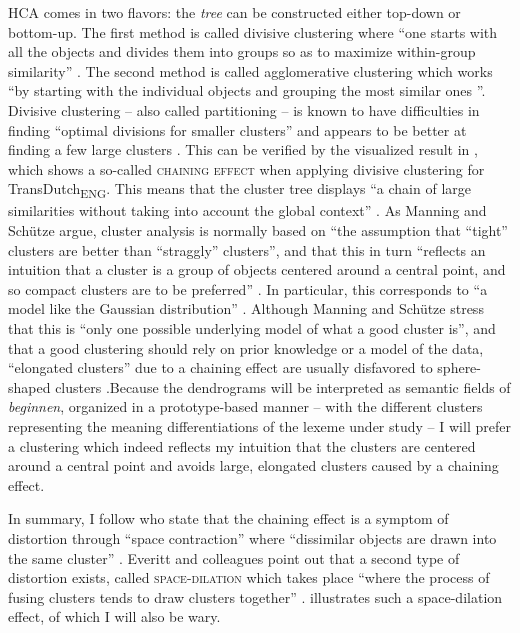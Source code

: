 HCA comes in two flavors: the \textit{tree} can be constructed either top-down or bottom-up. The first method is called divisive clustering where “one starts with all the objects and divides them into groups so as to maximize within-group similarity” \citep[501]{manning_foundations_1999}. The second method is called agglomerative clustering which works “by starting with the individual objects and grouping the most similar ones \citep[500--501]{manning_foundations_1999}”. Divisive clustering – also called partitioning – is known to have difficulties in finding “optimal divisions for smaller clusters” and appears to be better at finding a few large clusters \citep[138]{baayen_analyzing_2008}. This can be verified by the visualized result in , which shows a so-called \textsc{chaining effect} when applying divisive clustering for TransDutch\textsubscript{ENG}. This means that the cluster tree displays “a chain of large similarities without taking into account the global context” \citep[504]{manning_foundations_1999}. As Manning and Schütze argue, cluster analysis is normally based on “the assumption that ``tight'' clusters are better than ``straggly'' clusters”, and that this in turn “reflects an intuition that a cluster is a group of objects centered around a central point, and so compact clusters are to be preferred” \citep[506]{manning_foundations_1999}. In particular, this corresponds to “a model like the Gaussian distribution” \citep[506]{manning_foundations_1999}. Although Manning and Schütze stress that this is “only one possible underlying model of what a good cluster is”, and that a good clustering should rely on prior knowledge or a model of the data, “elongated clusters” due to a chaining effect are usually disfavored to sphere-shaped clusters \citep[506]{manning_foundations_1999}.\largerpage Because the dendrograms will be interpreted as semantic fields of \textit{beginnen}, organized in a prototype-based manner – with the different clusters representing the meaning differentiations of the lexeme under study – I will prefer a clustering which indeed reflects my intuition that the clusters are centered around a central point and avoids large, elongated clusters caused by a chaining effect.

In summary, I follow \citet[92]{everitt_cluster_2011} who state that the chaining effect is a symptom of distortion through “space contraction” where “dissimilar objects are drawn into the same cluster” \citep[92]{everitt_cluster_2011}. Everitt and colleagues point out that a second type of distortion exists, called \textsc{space-dilation} which takes place “where the process of fusing clusters tends to draw clusters together” \citet[92]{everitt_cluster_2011}.  illustrates such a space-dilation effect, of which I will also be wary.


